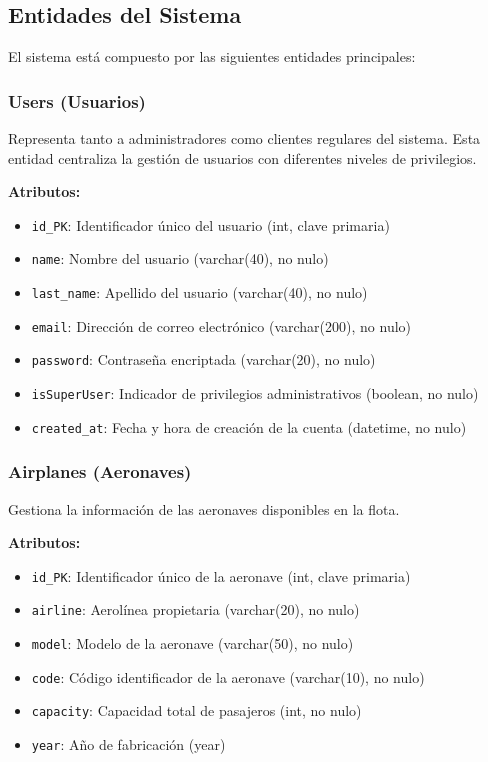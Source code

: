 \documentclass[12pt,a4paper]{article}
\begin{document}
\subsection{Entidades del Sistema}

El sistema está compuesto por las siguientes entidades principales:

\subsubsection{Users (Usuarios)}
Representa tanto a administradores como clientes regulares del sistema. Esta entidad centraliza la gestión de usuarios con diferentes niveles de privilegios.

\textbf{Atributos:}
\begin{itemize}
    \item \texttt{id\_PK}: Identificador único del usuario (int, clave primaria)
    \item \texttt{name}: Nombre del usuario (varchar(40), no nulo)
    \item \texttt{last\_name}: Apellido del usuario (varchar(40), no nulo)
    \item \texttt{email}: Dirección de correo electrónico (varchar(200), no nulo)
    \item \texttt{password}: Contraseña encriptada (varchar(20), no nulo)
    \item \texttt{isSuperUser}: Indicador de privilegios administrativos (boolean, no nulo)
    \item \texttt{created\_at}: Fecha y hora de creación de la cuenta (datetime, no nulo)
\end{itemize}

\subsubsection{Airplanes (Aeronaves)}
Gestiona la información de las aeronaves disponibles en la flota.

\textbf{Atributos:}
\begin{itemize}
    \item \texttt{id\_PK}: Identificador único de la aeronave (int, clave primaria)
    \item \texttt{airline}: Aerolínea propietaria (varchar(20), no nulo)
    \item \texttt{model}: Modelo de la aeronave (varchar(50), no nulo)
    \item \texttt{code}: Código identificador de la aeronave (varchar(10), no nulo)
    \item \texttt{capacity}: Capacidad total de pasajeros (int, no nulo)
    \item \texttt{year}: Año de fabricación (year)
\end{itemize}
\end{document}
